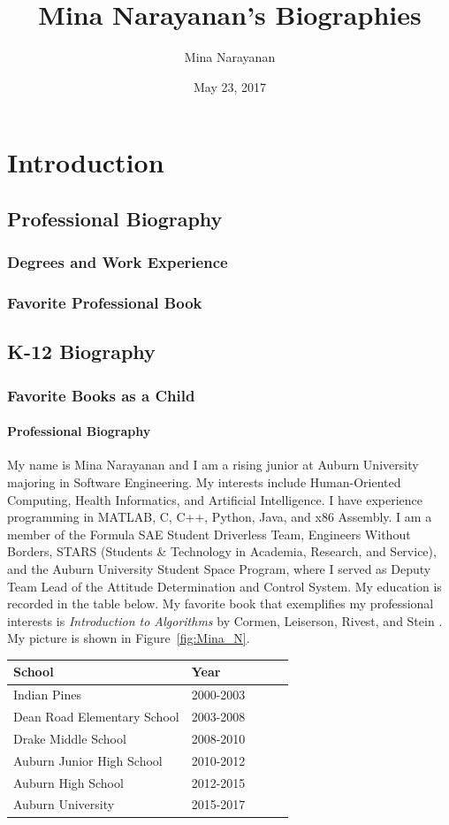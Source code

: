\documentclass{article}
\title{Mina Narayanan's Biographies}
\author{Mina Narayanan}
\date{May 23, 2017}
\begin{document}
\maketitle

\section{Introduction}
\subsection{Professional Biography}
\subsubsection{Degrees and Work Experience}
\subsubsection{Favorite Professional Book}
\subsection{K-12 Biography}
\subsubsection{Favorite Books as a Child}
\paragraph{Professional Biography}
    
My name is Mina Narayanan and I am a rising junior at Auburn University majoring in Software Engineering. My interests include Human-Oriented Computing, Health Informatics, and Artificial Intelligence. I have experience programming in MATLAB, C, C++, Python, Java, and x86 Assembly. I am a member of the Formula SAE Student Driverless Team, Engineers Without Borders, STARS (Students & Technology in Academia, Research, and Service), and the Auburn University Student Space Program, where I served as Deputy Team Lead of the Attitude Determination and Control System. My education is recorded in the table below. My favorite book that exemplifies my professional interests is \textit{Introduction to Algorithms} by Cormen, Leiserson, Rivest, and Stein \citep{algorithms}. My picture is shown in Figure~\ref{fig:Mina_N}.

\begin{table}
\begin{tabular}{lllcl}\hline{}
{\bf School} & {\bf Year} \\\hline
   Indian Pines & 2000-2003 \\
Dean Road Elementary School & 2003-2008 \\
Drake Middle School & 2008-2010\\
Auburn Junior High School & 2010-2012\\
Auburn High School & 2012-2015 \\
Auburn University & 2015-2017 \\\hline
\end{tabular}
\end{table}
\end{document}
